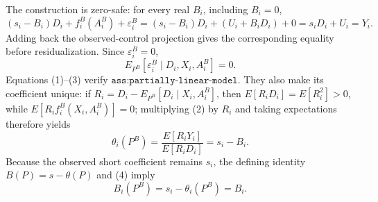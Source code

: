The construction is zero-safe: for every real \(B_i\), including \(B_i=0\),
\[
(s_i-B_i)D_i+f_i^B(A_i^B)+\varepsilon_i^B
=(s_i-B_i)D_i+(U_i+B_iD_i)+0
=s_iD_i+U_i=Y_i. \tag{2}
\]
Adding back the observed-control projection gives the corresponding equality before residualization.  Since \(\varepsilon_i^B=0\),
\[
E_{P^B}[\varepsilon_i^B\mid D_i,X_i,A_i^B]=0. \tag{3}
\]
Equations (1)--(3) verify \(\texttt{ass:partially-linear-model}\).  They also make its coefficient unique: if \(R_i=D_i-E_{P^B}[D_i\mid X_i,A_i^B]\), then \(E[R_iD_i]=E[R_i^2]>0\), while \(E[R_if_i^B(X_i,A_i^B)]=0\); multiplying (2) by \(R_i\) and taking expectations therefore yields
\[
\theta_i(P^B)=\frac{E[R_iY_i]}{E[R_iD_i]}=s_i-B_i. \tag{4}
\]
Because the observed short coefficient remains \(s_i\), the defining identity \(B(P)=s-\theta(P)\) and (4) imply
\[
B_i(P^B)=s_i-\theta_i(P^B)=B_i. \tag{5}
\]

